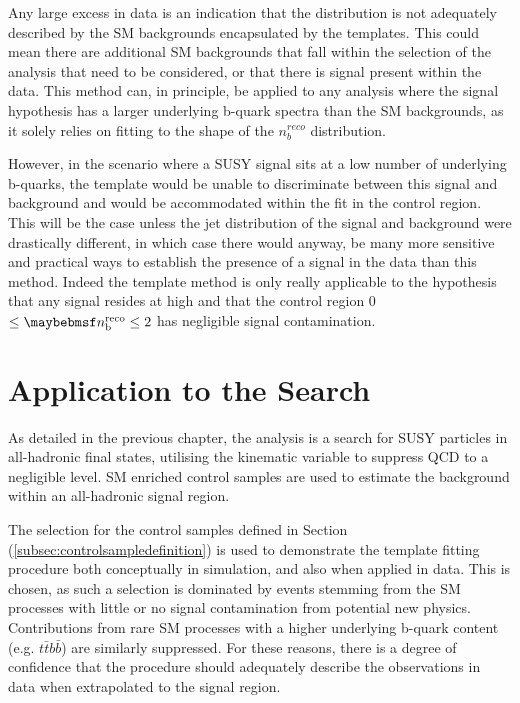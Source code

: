 Any large excess in data is an indication that the \nbreco distribution is not adequately described by the \ac{SM} backgrounds encapsulated by the templates. This could mean there are additional \ac{SM} backgrounds that fall within the selection of the analysis that need to be considered, or that there is signal present within the data. This method can, in principle, be applied to any analysis where the signal hypothesis has a larger underlying b-quark spectra than the \ac{SM} backgrounds, as it solely relies on fitting to the shape of the $n_{b}^{reco}$ distribution. 

However, in the scenario where a \ac{SUSY} signal sits at a low number of underlying b-quarks, the template would be unable to discriminate between this signal and background and would be accommodated within the fit in the control region. This will be the case unless the jet \pt distribution of the signal and background were drastically different, in which case there would anyway, be many more sensitive and practical ways to establish the presence of a signal in the data than this method. Indeed the template method is only really applicable to the hypothesis that any signal resides at high \nbreco and that the control region 0 $\leq \nbreco \leq 2$ has negligible signal contamination.  

\section{ Application to the \alphat Search}
\label{sec:templateapplication}

As detailed in the previous chapter, the \alphat analysis is a search for \ac{SUSY} particles in all-hadronic final states, utilising the kinematic variable \alphat to suppress QCD to a negligible level. \ac{SM} enriched control samples are used to estimate the background within an all-hadronic signal region. 

The selection for the \mupjets control samples defined in Section (\ref{subsec:controlsampledefinition}) is used to demonstrate the template fitting procedure both conceptually in simulation, and also when applied in data. This is chosen, as such a selection is dominated by events stemming from the \ac{SM} processes with little or no signal contamination from potential new physics. Contributions from rare \ac{SM} processes with a higher underlying b-quark content (e.g. $t\bar{t}b\bar{b}$) are similarly suppressed. For these reasons, there is a degree of confidence that the procedure should adequately describe the observations in data when extrapolated to the signal region.

